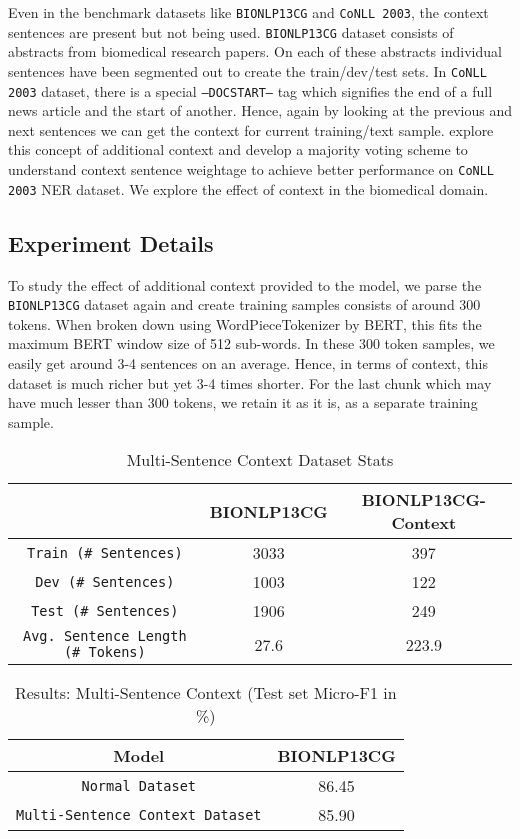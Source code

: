 Even in the benchmark datasets like \texttt{BIONLP13CG} and \texttt{CoNLL 2003}, the context sentences are present but not being used. \texttt{BIONLP13CG} dataset consists of abstracts from biomedical research papers. On each of these abstracts individual sentences have been segmented out to create the train/dev/test sets. In \texttt{CoNLL 2003} dataset, there is a special \texttt{--DOCSTART--} tag which signifies the end of a full news article and the start of another. Hence, again by looking at the previous and next sentences we can get the context for current training/text sample. \cite{luoma2020exploring} explore this concept of additional context and develop a majority voting scheme to understand context sentence weightage to achieve better performance on \texttt{CoNLL 2003} NER dataset. We explore the effect of context in the biomedical domain.

\subsection{Experiment Details}
To study the effect of additional context provided to the model, we parse the \texttt{BIONLP13CG} dataset again and create training samples consists of around 300 tokens. When broken down using WordPieceTokenizer by BERT, this fits the maximum BERT window size of 512 sub-words. In these 300 token samples, we easily get around 3-4 sentences on an average. Hence, in terms of context, this dataset is much richer but yet 3-4 times shorter. For the last chunk which may have much lesser than 300 tokens, we retain it as it is, as a separate training sample.

\begin{table}[h!]
\centering
\begin{tabular}{|c|c|c|}\hline
	\textbf{} & \textbf{BIONLP13CG} & \textbf{BIONLP13CG-Context}\\\hline
	\texttt{Train (\# Sentences)} & 3033 & 397\\\hline
	\texttt{Dev (\# Sentences)} & 1003 & 122\\\hline
	\texttt{Test (\# Sentences)} & 1906 & 249\\\hline
	\texttt{Avg. Sentence Length (\# Tokens)} & 27.6 & 223.9\\\hline
	\end{tabular}
    \caption{Multi-Sentence Context Dataset Stats}
    \label{tab:context_bio_dataset}
\end{table}

\begin{table}[h!]
\centering
\begin{tabular}{|c|c|}\hline
	\textbf{Model} & \textbf{BIONLP13CG}\\\hline
	\texttt{Normal Dataset} & 86.45\\\hline
	\texttt{Multi-Sentence Context Dataset} & 85.90\\\hline
	\end{tabular}
    \caption{Results: Multi-Sentence Context (Test set Micro-F1 in \%)}
    \label{tab:res_context_bio}
\end{table}

